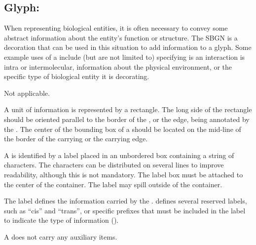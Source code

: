 \color{blue}

\subsection{Glyph: }
\label{sec:unitInformation}

When representing biological entities, it is often necessary to convey some abstract information about the entity's function or structure.  The SBGN  is a decoration that can be used in this situation to add information to a glyph.  Some example uses of a  include (but are not limited to) specifying is an interaction is intra or intermolecular, information about the physical environment, or the specific type of biological entity it is decorating.

\begin{glyphDescription}

\glyphSboTerm Not applicable.

\glyphContainer A unit of information is represented by a rectangle.  The long side of the rectangle should be oriented parallel to the border of the , or the edge, being annotated by the . The center of the bounding box of a  should be located on the mid-line of the border of the carrying  or the carrying edge.

\glyphLabel A  is identified by a label placed in an unbordered box containing a string of characters.  The characters can be distributed on several lines to improve readability, although this is not mandatory.  The label box must be attached to the center of the container.  The label may spill outside of the container.

The label defines the information carried by the .  \SBGNERLone defines several reserved labels, such as ``cis'' and ``trans'', or specific prefixes that must be included in the label to indicate the type of information ().

\glyphAux A  does not carry any auxiliary items.

\end{glyphDescription}

